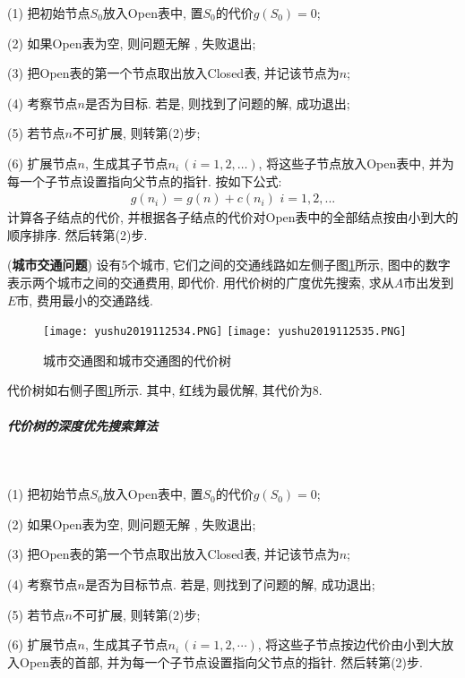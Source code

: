 (1) 把初始节点$S_0$放入Open表中, 置$S_0$的代价$g(S_0)=0$;

(2) 如果Open表为空, 则问题无解 , 失败退出;

(3) 把Open表的第一个节点取出放入Closed表, 并记该节点为$n$;

(4) 考察节点$n$是否为目标. 若是, 则找到了问题的解, 成功退出;

(5) 若节点$n$不可扩展, 则转第(2)步;

(6) 扩展节点$n$, 生成其子节点$n_i\,(i=1, 2, …)$, 将这些子节点放入Open表中, 并为每一个子节点设置指向父节点的指针. 按如下公式:
\begin{align}
  g(n_i)=g(n)+c(n_i)\,\,i=1,2,...
\end{align}
计算各子结点的代价, 并根据各子结点的代价对Open表中的全部结点按由小到大的顺序排序. 然后转第(2)步.
\begin{example}
(\textbf{城市交通问题}) 设有5个城市, 它们之间的交通线路如左侧子图\ref{AI32fig2019120234}所示, 图中的数字表示两个城市之间的交通费用, 即代价. 用代价树的广度优先搜索, 求从$A$市出发到$E$市, 费用最小的交通路线.
\end{example}
\begin{result}
\begin{figure}[H]
\centering
\texttt{[image: yushu2019112534.PNG]}
\texttt{[image: yushu2019112535.PNG]}
\caption{城市交通图和城市交通图的代价树 }
\label{AI32fig2019120234}
\end{figure}
代价树如右侧子图\ref{AI32fig2019120234}所示. 其中, 红线为最优解, 其代价为8.
\subparagraph{代价树的深度优先搜索算法}~{}

(1) 把初始节点$S_0$放入Open表中, 置$S_0$的代价$g(S_0)=0$;

(2) 如果Open表为空, 则问题无解 , 失败退出;

(3) 把Open表的第一个节点取出放入Closed表, 并记该节点为$n$;

(4) 考察节点$n$是否为目标节点. 若是, 则找到了问题的解, 成功退出;

(5) 若节点$n$不可扩展, 则转第(2)步;

(6) 扩展节点$n$, 生成其子节点$n_i\,(i=1, 2,\cdots)$, 将这些子节点按边代价由小到大放入Open表的首部, 并为每一个子节点设置指向父节点的指针. 然后转第(2)步.

\end{result}
